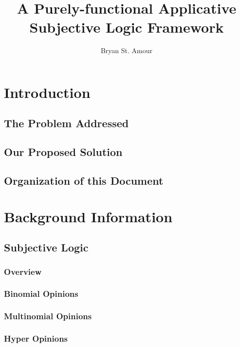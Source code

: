 \documentclass[a4paper]{report}
\title{A Purely-functional Applicative Subjective Logic Framework}
\author{Bryan St. Amour}
\begin{document}
\maketitle


\tableofcontents


\chapter{Introduction}

\section{The Problem Addressed}

\section{Our Proposed Solution}

\section{Organization of this Document}





\chapter{Background Information}

\section{Subjective Logic}

\subsection{Overview}

\subsection{Binomial Opinions}

\subsection{Multinomial Opinions}

\subsection{Hyper Opinions}
\end{document}
